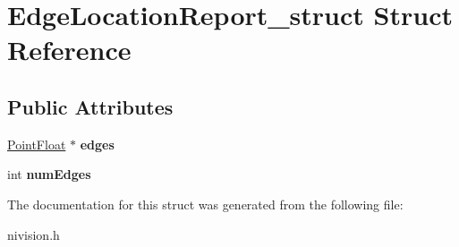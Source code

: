 \hypertarget{structEdgeLocationReport__struct}{\section{\-Edge\-Location\-Report\-\_\-struct \-Struct \-Reference}
\label{structEdgeLocationReport__struct}
}
\subsection*{\-Public \-Attributes}
\begin{DoxyCompactItemize}
\item 
\hypertarget{structEdgeLocationReport__struct_aa3f03ba0b204bbd25ad238e7c74990b3}{\hyperlink{structPointFloat__struct}{\-Point\-Float} $\ast$ {\bfseries edges}}\label{structEdgeLocationReport__struct_aa3f03ba0b204bbd25ad238e7c74990b3}

\item 
\hypertarget{structEdgeLocationReport__struct_a87cce8fb42e648b8baa5f62dd376f541}{int {\bfseries num\-Edges}}\label{structEdgeLocationReport__struct_a87cce8fb42e648b8baa5f62dd376f541}

\end{DoxyCompactItemize}


\-The documentation for this struct was generated from the following file\-:\begin{DoxyCompactItemize}
\item 
nivision.\-h\end{DoxyCompactItemize}
